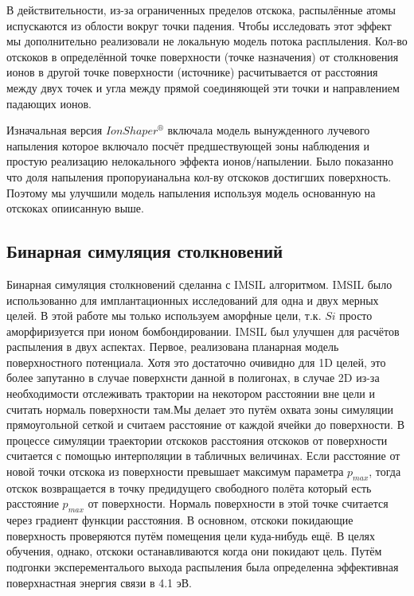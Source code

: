 \documentclass[a4paper,fontsize=12pt]{article}
\begin{document}
В действительности, из-за ограниченных пределов отскока, распылённые атомы испускаются из облости вокруг точки падения. Чтобы исследовать этот эффект мы дополнительно реализовали не локальную модель потока расплыления. Кол-во отскоков в определённой точке поверхности (точке назначения) от столкновения ионов в другой точке поверхности (источнике) расчитывается от расстояния между двух точек и угла между прямой соединяющей эти точки и направлением падающих ионов.

Изначальная версия $IonShaper^{®}$ включала модель вынужденного лучевого напыления которое включало посчёт предшествующей зоны наблюдения и простую реализацию нелокального эффекта ионов/напылении. Было показанно что доля напыления пропоруианальна кол-ву отскоков достигших поверхность. Поэтому мы улучшили модель напыления используя модель основанную на отскоках опиисанную выше.

\subsection{Бинарная симуляция столкновений}

Бинарная симуляция столкновений сделанна с IMSIL алгоритмом. IMSIL было использованно для имплантационных исследований для одна и двух мерных целей. В этой работе мы только используем аморфные цели, т.к. $Si$ просто аморфиризуется при ионом бомбондировании. IMSIL был улучшен для расчётов распыления в двух аспектах. Первое, реализована планарная модель поверхностного потенциала. Хотя это достаточно очивидно для 1D целей, это более запутанно в случае поверхнсти данной в полигонах, в случае 2D из-за необходимости отслеживать трактории на некотором расстоянии вне цели и считать нормаль поверхности там.Мы делает это путём охвата зоны симуляции прямоугольной сеткой и считаем расстояние от каждой ячейки до поверхности. В процессе симуляции траектории отскоков расстояния отскоков от поверхности считается с помощью интерполяции в табличных величинах. Если расстояние от новой точки отскока из поверхности превышает максимум параметра $p_{max}$, тогда отскок возвращается в точку предидущего свободного полёта который есть расстояние $p_{max}$ от поверхности. Нормаль поверхности в этой точке считается через градиент функции расстояния. В основном, отскоки покидающие поверхность проверяются путём помещения цели куда-нибудь ещё. В целях обучения, однако, отскоки останавливаются когда они покидают цель. Путём подгонки эксперементалього выхода распыления была определенна эффективная поверхнастная энергия связи в 4.1 эВ.
\end{document}

